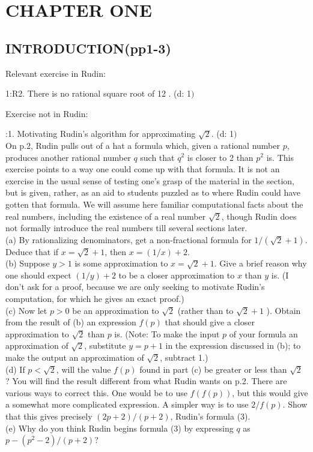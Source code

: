 \documentclass[12pt]{ctexart}
\theoremstyle{definition}
\theoremstyle{plain}
\theoremstyle{remark}
\begin{document}
\section{CHAPTER ONE}
\label{sec:CHAPTER ONE}
\subsection{INTRODUCTION(pp1-3)}
Relevant exercise in Rudin: 

1:R2. There is no rational square root of 12 . (d: 1\()\)

\noindent Exercise not in Rudin:

:1. Motivating Rudin's algorithm for approximating \(\sqrt{2}\). (d: 1\()\) \\
On p.2, Rudin pulls out of a hat a formula which, given a rational number \(p\), produces another rational number \(q\) such that \(q^2\) is closer to 2 than \(p^2\) is. This exercise points to a way one could come up with that formula. It is not an exercise in the usual sense of testing one's grasp of the material in the section, but is given, rather, as an aid to students puzzled as to where Rudin could have gotten that formula. We will assume here familiar computational facts about the real numbers, including the existence of a real number \(\sqrt{2}\), though Rudin does not formally introduce the real numbers till several sections later. \\
(a) By rationalizing denominators, get a non-fractional formula for \(1 /(\sqrt{2}+1)\). Deduce that if \(x=\sqrt{2}+1\), then \(x=(1 / x)+2\). \\ 
(b) Suppose \(y>1\) is some approximation to \(x=\sqrt{2}+1\). Give a brief reason why one should expect \((1 / y)+2\) to be a closer approximation to \(x\) than \(y\) is. (I don't ask for a proof, because we are only seeking to motivate Rudin's computation, for which he gives an exact proof.)\\
(c) Now let \(p>0\) be an approximation to \(\sqrt{2}\) (rather than to \(\sqrt{2}+1\) ). Obtain from the result of (b) an expression \(f(p)\) that should give a closer approximation to \(\sqrt{2}\) than \(p\) is. (Note: To make the input \(p\) of your formula an approximation of \(\sqrt{2}\), substitute \(y=p+1\) in the expression discussed in (b); to make the output an approximation of \(\sqrt{2}\), subtract 1.) \\ 
(d) If \(p<\sqrt{2}\), will the value \(f(p)\) found in part (c) be greater or less than \(\sqrt{2}\) ? You will find the result different from what Rudin wants on p.2. There are various ways to correct this. One would be to use \(f(f(p))\), but this would give a somewhat more complicated expression. A simpler way is to use \(2 / f(p)\). Show that this gives precisely \((2 p+2) /(p+2)\), Rudin's formula (3). \\
(e) Why do you think Rudin begins formula (3) by expressing \(q\) as \(p-\left(p^2-2\right) /(p+2)\)?
\medskip
\end{document}

